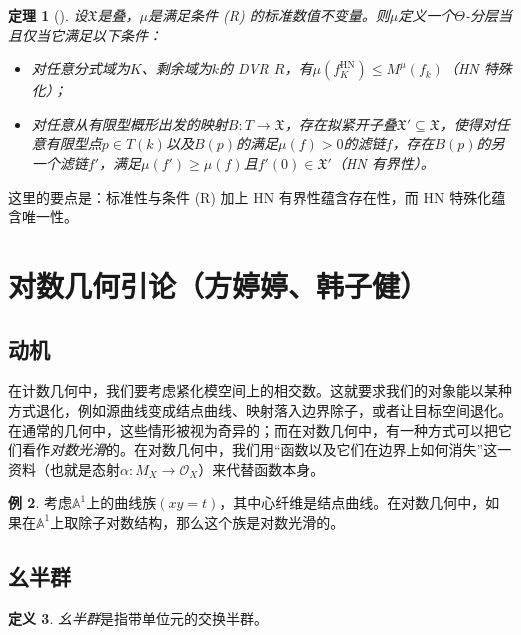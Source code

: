 \documentclass{amsart}
\newtheorem{thm}{定理}[section]
\theoremstyle{definition}
\newtheorem{defn}[thm]{定义}
\newtheorem{exm}[thm]{例}
\theoremstyle{remark}
\theoremstyle{plain}
\theoremstyle{definition}
\theoremstyle{remark}
\newcommand{\A}{\mathbb{A}}
\newcommand{\mc}[1]{\mathcal{#1}}
\newcommand{\mf}[1]{\mathfrak{#1}}
\newcommand{\mr}[1]{\mathrm{#1}}
\newcommand{\1}{\mathbf{1}}
\newcommand{\2}{\mathbf{2}}
\newcommand{\3}{\mathbf{3}}
\begin{document}
\begin{thm}[{\cite{HLinstability}}]
    设\(\mf{X}\)是叠，\(\mu\)是满足条件 (R) 的标准数值不变量。则\(\mu\)定义一个\(\Theta\)-分层当且仅当它满足以下条件：
    \begin{itemize}
        \item 对任意分式域为\(K\)、剩余域为\(k\)的 DVR \(R\)，有\(\mu(f_K^{\mr{HN}}) \leq M^{\mu}(f_k)\)（HN 特殊化）；
        \item 对任意从有限型概形出发的映射\(B \colon T \to \mf{X}\)，存在拟紧开子叠\(\mf{X}' \subseteq \mf{X}\)，使得对任意有限型点\(p \in T(k)\)以及\(B(p)\)的满足\(\mu(f) > 0\)的滤链\(f\)，存在\(B(p)\)的另一个滤链\(f'\)，满足\(\mu(f') \geq \mu(f)\)且\(f'(0) \in \mf{X}'\)（HN 有界性）。
    \end{itemize}
\end{thm}

这里的要点是：标准性与条件 (R) 加上 HN 有界性蕴含存在性，而 HN 特殊化蕴含唯一性。



\section{对数几何引论（方婷婷、韩子健）}%
\label{sec:Intro to log geometry (Tingting Fang and Zijian Han)}

\subsection{动机}%
\label{sub:Motivation}

在计数几何中，我们要考虑紧化模空间上的相交数。这就要求我们的对象能以某种方式退化，例如源曲线变成结点曲线、映射落入边界除子，或者让目标空间退化。在通常的几何中，这些情形被视为奇异的；而在对数几何中，有一种方式可以把它们看作\textit{对数光滑}的。在对数几何中，我们用“函数以及它们在边界上如何消失”这一资料（也就是态射\(\alpha \colon M_X \to \mc{O}_X\)）来代替函数本身。

\begin{exm}
    考虑\(\A^1\)上的曲线族\((xy=t)\)，其中心纤维是结点曲线。在对数几何中，如果在\(\A^1\)上取除子对数结构，那么这个族是对数光滑的。
\end{exm}

\subsection{幺半群}%
\label{sub:Monoids}

\begin{defn}
    \textit{幺半群}是指带单位元的交换半群。
\end{defn}
\end{document}
